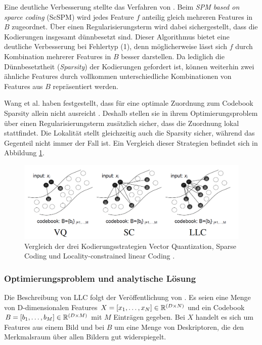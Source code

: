 Eine deutliche Verbesserung stellte das Verfahren von \cite{yygh09}. Beim \emph{SPM based on sparce coding} (ScSPM) wird jedes Feature $f$ anteilig gleich mehreren Features in $B$ zugeordnet. Über einen Regularisierungsterm wird dabei sichergestellt, dass die Kodierungen insgesamt dünnbesetzt sind. Dieser Algorithmus bietet eine deutliche Verbesserung bei Fehlertyp (1), denn möglicherweise lässt sich $f$ durch Kombination mehrerer Features in $B$ besser darstellen. Da lediglich die Dünnbesetztheit (\emph{Sparsity}) der Kodierungen gefordert ist, können weiterhin zwei ähnliche Features durch vollkommen unterschiedliche Kombinationen von Features aus $B$ repräsentiert werden.

Wang et al. haben festgestellt, dass für eine optimale Zuordnung zum Codebook Sparsity allein nicht ausreicht \cite{wyylhg10}. Deshalb stellen sie in ihrem Optimierungsproblem über einen Regularisierungsterm zusätzlich sicher, dass die Zuordnung lokal stattfindet. Die Lokalität stellt gleichzeitig auch die Sparsity sicher, während das Gegenteil nicht immer der Fall ist. Ein Vergleich dieser Strategien befindet sich in Abbildung \ref{img:quant_comp}.

\begin{figure}
	\centering
	\includegraphics[scale=0.5]{img/quant_comp.png}
	\caption{Vergleich der drei Kodierungsstrategien Vector Quantization, Sparse Coding und Locality-constrained linear Coding \cite{wyylhg10}.}
	\label{img:quant_comp}
\end{figure}

\subsubsection{Optimierungsproblem und analytische Lösung}
\label{sec:llc}

Die Beschreibung von LLC folgt der Veröffentlichung von \cite{wyylhg10}. Es seien eine Menge von D-dimensionalen Features $X = [x_1, \dots, x_N] \in \mathbb{R}^{(D \times N)}$ und ein Codebook $B = [b_1, \dots, b_M] \in \mathbb{R}^{(D \times M)}$ mit $M$ Einträgen gegeben. Bei $X$ handelt es sich um Features aus einem Bild und bei $B$ um eine Menge von Deskriptoren, die den Merkmalsraum über allen Bildern gut widerspiegelt.
 
